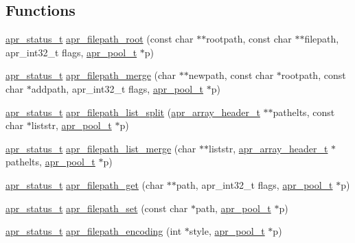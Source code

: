 \subsection*{Functions}
\begin{DoxyCompactItemize}
\item 
\hyperlink{group__apr__errno_gaf76ee4543247e9fb3f3546203e590a6c}{apr\+\_\+status\+\_\+t} \hyperlink{group__apr__filepath_ga1eacdd5ed069faa137bde014fa50494d}{apr\+\_\+filepath\+\_\+root} (const char $\ast$$\ast$rootpath, const char $\ast$$\ast$filepath, apr\+\_\+int32\+\_\+t flags, \hyperlink{group__apr__pools_gaf137f28edcf9a086cd6bc36c20d7cdfb}{apr\+\_\+pool\+\_\+t} $\ast$p)
\item 
\hyperlink{group__apr__errno_gaf76ee4543247e9fb3f3546203e590a6c}{apr\+\_\+status\+\_\+t} \hyperlink{group__apr__filepath_gae89fd67108f10dc5044b6d062dde0138}{apr\+\_\+filepath\+\_\+merge} (char $\ast$$\ast$newpath, const char $\ast$rootpath, const char $\ast$addpath, apr\+\_\+int32\+\_\+t flags, \hyperlink{group__apr__pools_gaf137f28edcf9a086cd6bc36c20d7cdfb}{apr\+\_\+pool\+\_\+t} $\ast$p)
\item 
\hyperlink{group__apr__errno_gaf76ee4543247e9fb3f3546203e590a6c}{apr\+\_\+status\+\_\+t} \hyperlink{group__apr__filepath_gaf259849de62ac172dde7dcbe73421500}{apr\+\_\+filepath\+\_\+list\+\_\+split} (\hyperlink{structapr__array__header__t}{apr\+\_\+array\+\_\+header\+\_\+t} $\ast$$\ast$pathelts, const char $\ast$liststr, \hyperlink{group__apr__pools_gaf137f28edcf9a086cd6bc36c20d7cdfb}{apr\+\_\+pool\+\_\+t} $\ast$p)
\item 
\hyperlink{group__apr__errno_gaf76ee4543247e9fb3f3546203e590a6c}{apr\+\_\+status\+\_\+t} \hyperlink{group__apr__filepath_ga8316896ab8e3901f9711d9d4cc89b373}{apr\+\_\+filepath\+\_\+list\+\_\+merge} (char $\ast$$\ast$liststr, \hyperlink{structapr__array__header__t}{apr\+\_\+array\+\_\+header\+\_\+t} $\ast$pathelts, \hyperlink{group__apr__pools_gaf137f28edcf9a086cd6bc36c20d7cdfb}{apr\+\_\+pool\+\_\+t} $\ast$p)
\item 
\hyperlink{group__apr__errno_gaf76ee4543247e9fb3f3546203e590a6c}{apr\+\_\+status\+\_\+t} \hyperlink{group__apr__filepath_gaac7c26321fd60d7304326fe531639507}{apr\+\_\+filepath\+\_\+get} (char $\ast$$\ast$path, apr\+\_\+int32\+\_\+t flags, \hyperlink{group__apr__pools_gaf137f28edcf9a086cd6bc36c20d7cdfb}{apr\+\_\+pool\+\_\+t} $\ast$p)
\item 
\hyperlink{group__apr__errno_gaf76ee4543247e9fb3f3546203e590a6c}{apr\+\_\+status\+\_\+t} \hyperlink{group__apr__filepath_ga9773589b65b7f0b7d5b59d427fd0eb93}{apr\+\_\+filepath\+\_\+set} (const char $\ast$path, \hyperlink{group__apr__pools_gaf137f28edcf9a086cd6bc36c20d7cdfb}{apr\+\_\+pool\+\_\+t} $\ast$p)
\item 
\hyperlink{group__apr__errno_gaf76ee4543247e9fb3f3546203e590a6c}{apr\+\_\+status\+\_\+t} \hyperlink{group__apr__filepath_gad4d3a5888a54a52b3552911e448a3eb3}{apr\+\_\+filepath\+\_\+encoding} (int $\ast$style, \hyperlink{group__apr__pools_gaf137f28edcf9a086cd6bc36c20d7cdfb}{apr\+\_\+pool\+\_\+t} $\ast$p)
\end{DoxyCompactItemize}


